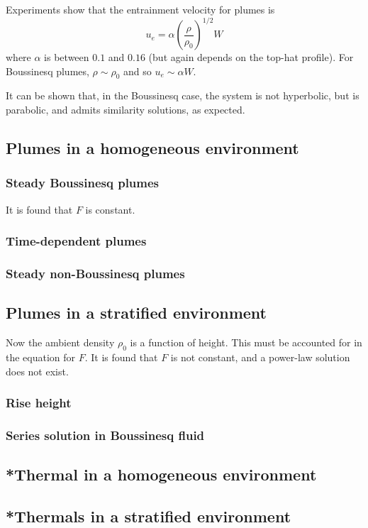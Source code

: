 Experiments show that the entrainment velocity for plumes is 
\begin{equation}
 u_e = \alpha \left(\frac{\rho}{\rho_0}\right)^{1/2} W
\end{equation}
where $\alpha$ is between $0.1$ and $0.16$ (but again depends on the top-hat profile). For Boussinesq plumes, $\rho\sim\rho_0$ and so $u_e \sim \alpha W$. 

It can be shown that, in the Boussinesq case, the system is not hyperbolic, but is parabolic, and admits similarity solutions, as expected. 

\subsection{Plumes in a homogeneous environment}
\subsubsection{Steady Boussinesq plumes}

It is found that $F$ is constant. 

\subsubsection{Time-dependent plumes}
\subsubsection{Steady non-Boussinesq plumes}

\subsection{Plumes in a stratified environment}

Now the ambient density $\rho_0$ is a function of height. This must be accounted for in the equation for $F$. It is found that $F$ is not constant, and a power-law solution does not exist.

\subsubsection{Rise height}
\subsubsection{Series solution in Boussinesq fluid}

\subsection{*Thermal in a homogeneous environment}
\subsection{*Thermals in a stratified environment}